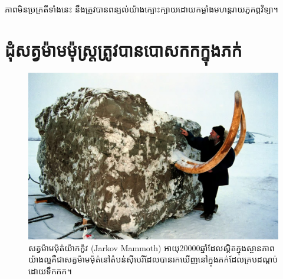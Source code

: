 \documentclass[10pt,twocolumn,letterpaper]{article}
\begin{document}
ភាពមិនប្រក្រតីទាំងនេះ នឹងត្រូវបានពន្យល់យ៉ាងក្បោះក្បាយដោយកម្លាំងមហន្តរាយភូគព្ភវិទ្យា។

\section{ដុំសត្វម៉ាមម៉ុស្ដ្រត្រូវបានបោសកកក្នុងភក់}
\begin{figure}[t]
\begin{center}
   \includegraphics[width=1\linewidth]{jarkov-mammoth.jpg}
\end{center}
   \caption{សត្វម៉ាមម៉ុត់យ៉ាកក៉ូវ (Jarkov Mammoth) អាយុ20000ឆ្នាំដែលស្តិតក្នុងស្ថានភាពយ៉ាងល្អគឺជាសត្វម៉ាមម៉ុត់នៅតំបន់ស៊ីបេរីដែលបានរកឃើញនៅក្នុងភក់ដែលគ្របដណ្តប់ដោយទឹកកក\cite{51}។}
\label{fig:1}
\label{fig:onecol}
\end{figure}
\end{document}
